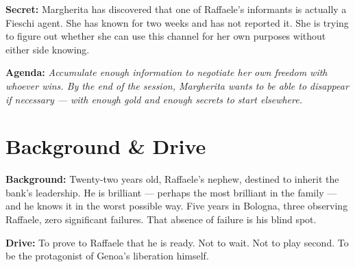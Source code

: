 \clearpage
\begin{secretbox}
\textbf{Secret:} Margherita has discovered that one of Raffaele's informants is
actually a Fieschi agent. She has known for two weeks and has not reported it.
She is trying to figure out whether she can use this channel for her own purposes
without either side knowing.

\medskip\noindent\textcolor{SecretRed}{\textbf{Agenda:}} \textit{Accumulate enough
information to negotiate her own freedom with whoever wins. By the end of the session,
Margherita wants to be able to disappear if necessary --- with enough gold and enough
secrets to start elsewhere.}
\end{secretbox}

\clearpage


\section*{Background \& Drive}
\begin{rulebox}{}
\textbf{Background:} Twenty-two years old, Raffaele's nephew, destined to inherit the
bank's leadership. He is brilliant --- perhaps the most brilliant in the family ---
and he knows it in the worst possible way. Five years in Bologna, three observing
Raffaele, zero significant failures. That absence of failure is his blind spot.

\medskip\noindent\textcolor{SpinolaRed}{\textbf{Drive:}} To prove to Raffaele that
he is ready. Not to wait. Not to play second. To be the protagonist of Genoa's
liberation himself.
\end{rulebox}

